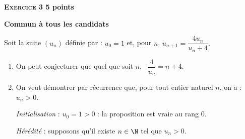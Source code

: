 \textbf{\large\textsc{Exercice 3} \hfill 5 points}

\textbf{Commun à tous les candidats}

\medskip

Soit la suite $\left(u_n\right)$ définie par : $u_0 = 1$ et, pour $n$,
$ u_{n+1}  = \dfrac{4u_n}{u_n + 4}.$

\smallskip

\begin{enumerate}
\item
%
%
On peut conjecturer que quel que soit $n$, \, $\dfrac{4}{u_n} = n + 4$.
\item On veut démontrer par récurrence que, pour tout entier naturel $n$, on a : $u_n > 0$.

\emph{Initialisation} : $u_0 = 1 > 0$ : la proposition est vraie au rang $0$.

\emph{Hérédité} : supposons qu'il existe $n \in \N$ tel que $u_n > 0$.


\end{enumerate}
